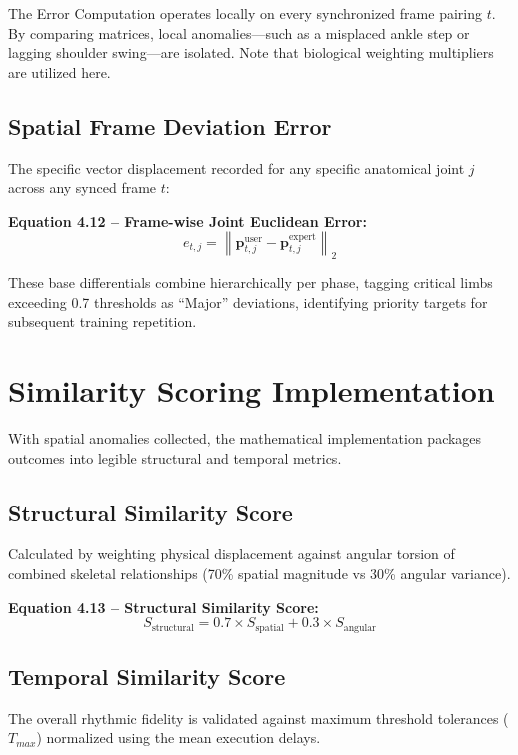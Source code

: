 \begin{sloppypar}
The Error Computation operates locally on every synchronized frame pairing $t$. By comparing matrices, local anomalies—such as a misplaced ankle step or lagging shoulder swing—are isolated. Note that biological weighting multipliers are utilized here.

\subsection{Spatial Frame Deviation Error}
The specific vector displacement recorded for any specific anatomical joint $j$ across any synced frame $t$:

\textbf{Equation 4.12 -- Frame-wise Joint Euclidean Error:}
\begin{equation}
e_{t,j} = \left\| \mathbf{p}^{\text{user}}_{t,j} - \mathbf{p}^{\text{expert}}_{t,j} \right\|_2
\tag{4.12}
\end{equation}

These base differentials combine hierarchically per phase, tagging critical limbs exceeding 0.7 thresholds as ``Major'' deviations, identifying priority targets for subsequent training repetition.


\section{Similarity Scoring Implementation}

With spatial anomalies collected, the mathematical implementation packages outcomes into legible structural and temporal metrics.

\subsection{Structural Similarity Score}
Calculated by weighting physical displacement against angular torsion of combined skeletal relationships (70\% spatial magnitude vs 30\% angular variance).

\textbf{Equation 4.13 -- Structural Similarity Score:}
\begin{equation}
S_{\text{structural}} = 0.7 \times S_{\text{spatial}} + 0.3 \times S_{\text{angular}}
\tag{4.13}
\end{equation}

\subsection{Temporal Similarity Score}
The overall rhythmic fidelity is validated against maximum threshold tolerances ($T_{max}$) normalized using the mean execution delays.


\end{sloppypar}
